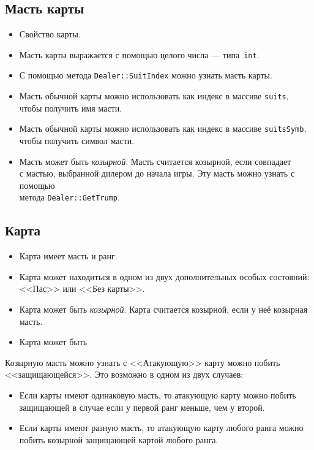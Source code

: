 \documentclass[a4paper,12pt]{article}
\begin{document}
        \subsection{Масть карты}
            \begin{itemize}
                \item[] Свойство карты.
                \item[] Масть карты выражается с помощью целого числа --- типа~\texttt{int}.
                \item[] С помощью метода \texttt{Dealer::SuitIndex} можно узнать масть карты.
                \item[] Масть обычной карты можно использовать как индекс в массиве \texttt{suits}, чтобы получить имя масти.
                \item[] Масть обычной карты можно использовать как индекс в массиве \texttt{suitsSymb}, чтобы получить символ масти.
                \item[] Масть может быть \textit{козырной}.
                        Масть считается козырной, если совпадает\\с мастью, выбранной дилером до начала игры. 
                        Эту масть можно узнать с помощью\\метода \texttt{Dealer::GetTrump}.
            \end{itemize}

        \subsection{Карта}
            \begin{itemize}
                \item[] Карта имеет масть и ранг.
                \item[] Карта может находиться в одном из двух дополнительных особых состояний: <<Пас>> или <<Без карты>>.
                \item[] Карта может быть \textit{козырной}.
                        Карта считается козырной, если у неё козырная масть.
                \item[] Карта может быть 
                     

            \end{itemize}
        
            Козырную масть можно узнать с 
            <<Атакующую>> карту можно побить <<защищающейся>>. Это возможно в одном из двух случаев:
            \begin{itemize} 
                \item Если карты имеют одинаковую масть, то атакующую карту можно побить защищающей в случае если у первой ранг меньше, чем у второй.
                \item Если карты имеют разную масть, то атакующую карту любого ранга можно побить козырной защищающей картой любого ранга.
            \end{itemize}
\end{document}
